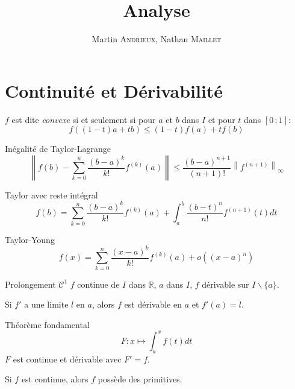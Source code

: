 \documentclass[french, a4paper, 10pt, twocolumn]{article}
\title{Analyse}
\author{Martin \textsc{Andrieux}, Nathan \textsc{Maillet}}
\date{}
\newcommand{\ssi}{si et seulement si\xspace}		%
\newcommand{\R}{\mathbb{R}}   %
\newcommand{\po}{\left(}         %
\newcommand{\pf}{\right)}        %
\newcommand{\pof}[1]{\po #1 \pf} %
\newcommand{\interff}[2]{\left[#1\,;#2\right]}   %
\begin{document}
\maketitle

\section{Continuité et Dérivabilité}
\begin{definition}
  $f$ est dite \emph{convexe} \ssi pour $a$ et $b$ dans $I$ et pour $t$ dans $\interff{0}{1}$:
  \[f((1-t)a+tb)\leqslant (1-t)f(a)+tf(b)\]
\end{definition}

\begin{theoreme}{Inégalité de Taylor-Lagrange}
  \[\left\lVert f(b)-\sum_{k=0}^{n}\dfrac{\pof{b-a}^{k}}{k!}f^{(k)}(a)\right\rVert \leqslant\dfrac{\pof{b-a}^{n+1}}{(n+1)!}\left\lVert f^{(n+1)}\right\rVert_{\infty}\]
\end{theoreme}

\begin{theoreme}{Taylor avec reste intégral}
\[f(b)=\sum_{k=0}^{n}\dfrac{\pof{b-a}^{k}}{k!}f^{(k)}(a)+\int_{a}^{b}\dfrac{\pof{b-t}^{n}}{n!}f^{(n+1)}(t)dt\]
\end{theoreme}

\begin{theoreme}{Taylor-Young}
\[f(x)=\sum_{k=0}^{n}\dfrac{\pof{x-a}^{k}}{k!}f^{(k)}(a)+o\pof{(x-a)^{n}}\]
\end{theoreme}

\begin{theoreme}{Prolongement $\mathcal C^{1}$}
  $f$ continue de $I$ dans $\R$, $a$ dans $I$, $f$ dérivable sur $I\backslash \lbrace a\rbrace$.

  Si $f'$ a une limite $l$ en $a$, alors $f$ est dérivable en $a$ et $f'(a)=l$.
\end{theoreme}

\begin{theoreme}{Théorème fondamental}
  \[F : x\mapsto \int_{a}^{x}f(t)dt\]
  $F$ est continue et dérivable avec $F'=f$.

  Si $f$ est continue, alors $f$ possède des primitives.
\end{theoreme}
\end{document}
